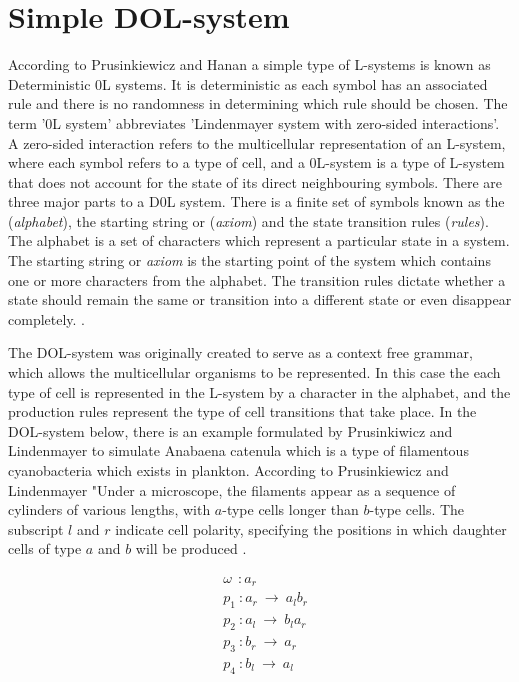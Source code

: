\section{Simple DOL-system} \label{Simple DOL-systems}

According to Prusinkiewicz and Hanan a simple type of L-systems is known as Deterministic 0L systems. It is deterministic as each symbol has an associated rule and there is no randomness in determining which rule should be chosen. The term '0L system' abbreviates 'Lindenmayer system with zero-sided interactions'. A zero-sided interaction refers to the multicellular representation of an L-system, where each symbol refers to a type of cell, and a 0L-system is a type of L-system that does not account for the state of its direct neighbouring symbols. There are three major parts to a D0L system. There is a finite set of symbols known as the (\textit{alphabet}), the starting string or (\textit{axiom}) and the state transition rules (\textit{rules}). The alphabet is a set of characters which represent a particular state in a system. The starting string or \textit{axiom} is the starting point of the system which contains one or more characters from the alphabet. The transition rules dictate whether a state should remain the same or transition into a different state or even disappear completely. \cite{prusinkiewicz2013lindenmayer}. 

The DOL-system was originally created to serve as a context free grammar, which allows the multicellular organisms to be represented. In this case the each type of cell is represented in the L-system by a character in the alphabet, and the production rules represent the type of cell transitions that take place. In the DOL-system below, there is an example formulated by Prusinkiwicz and Lindenmayer to simulate Anabaena catenula which is a type of filamentous cyanobacteria which exists in plankton. According to Prusinkiewicz and Lindenmayer "Under a microscope, the filaments appear as a sequence of cylinders of various lengths, with $a$-type cells longer than $b$-type cells. The subscript $l$ and $r$ indicate cell polarity, specifying the positions in which daughter cells of type $a$ and $b$ will be produced \cite{prusinkiewicz2012algorithmic}.

\begin{equation} \label{DOL-system example}
\begin{aligned}
	&\omega~~ : a_r \\
	&p_1~ :  a_r~ \rightarrow~ a_l b_r\\
	&p_2~ :  a_l~ \rightarrow~ b_l a_r\\
	&p_3~ :  b_r~ \rightarrow~ a_r\\
	&p_4~ :  b_l~ \rightarrow~ a_l\\
\end{aligned}
\end{equation}

